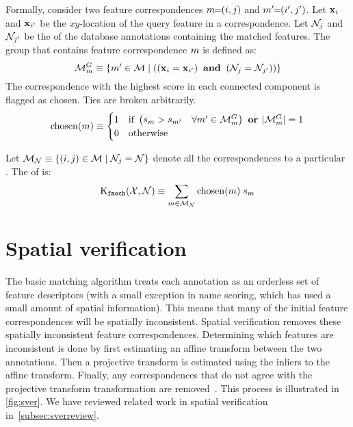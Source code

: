             \newcommand{\MatchesGroup}{\Matches^{G}}

            Formally, consider two feature correspondences $m\mkern-6mu=\mkern-6mu(i, j)$ and $m'\mkern-6mu=\mkern-6mu(i', j')$.
            Let $\mathbf{x}_{i}$ and $\mathbf{x}_{i'}$ be the $xy$-location of the query feature in a correspondence. Let
            $\mathcal{N}_{j}$ and $\mathcal{N}_{j'}$ be the \name{} of the database annotations containing the matched
            features. The group that contains feature correspondence $m$ is defined as:
            \begin{equation}
                \MatchesGroup_{\mI} \eqv \curly{\mII \in \Matches  \where
                \paren{
                    \paren{\pt_{\iI} \eq \pt_{\iII}} \AND 
                    \paren{\nid_{\jI} \eq \nid_{\jII}}
                }
            }
            \end{equation}
            The correspondence with the highest score in each connected component is flagged as chosen. Ties are
            broken arbitrarily.
            \begin{equation}
                \ischosen(\mI) \eqv 
                \bincase{
                \paren{
                    \fs_{\mI} > \fs_{\mII} 
                    \quad \forall \mII  \in \MatchesGroup_{\mI}
                } 
                \OR
                \card{\MatchesGroup_{\mI}} \eq 1
                }
            \end{equation}

            Let $\mathcal{M}_{\mathcal{N}} \equiv \{(i, j) \in \mathcal{M} \mid
              \mathcal{N}_j = \mathcal{N}\}$ denote all the correspondences to a particular
              \name{}.
            The \nscore{} of \aan{\name{}} is:
            \begin{equation}
                \operatorname{K_{{\tt{fmech}}}}(\mathcal{X}, \mathcal{N}) 
                \equiv 
                \sum_{m \in \mathcal{M}_{\mathcal{N}}} \operatorname{chosen}(m) \; s_m
            \end{equation}

            \namematch{}


\FloatBarrier{}
\section{Spatial verification}\label{sec:sver}

    The basic matching algorithm treats each annotation as an orderless set of feature descriptors (with a small
    exception in name scoring, which has used a small amount of spatial information). This means that many of the
    initial feature correspondences will be spatially inconsistent. Spatial verification removes these spatially
    inconsistent feature correspondences. Determining which features are inconsistent is done by first estimating
    an affine transform between the two annotations. Then a projective transform is estimated using the inliers to
    the affine transform. Finally, any correspondences that do not agree with the projective transform
    transformation are removed~\cite{fischler_random_1981, philbin_object_2007}. This process is illustrated in
    \cref{fig:sver}. We have reviewed related work in spatial verification in~\cref{subsec:sverreview}.

